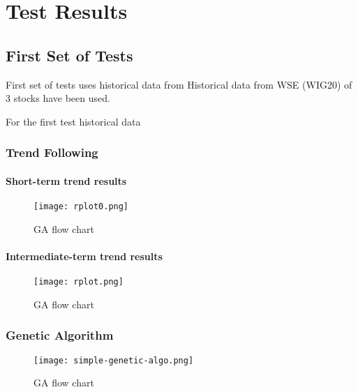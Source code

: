 \chapter{Test Results}
\label{cha:pierwszyDokument}

\section{First Set of Tests}

First set of tests uses historical data from 
Historical data from WSE (WIG20) of 3 stocks have been used.


For the first test historical data

\subsection{Trend Following}

\subsubsection{Short-term trend results}

\begin{figure}[H]
  \begin{center}
    \texttt{[image: rplot0.png]}
  \end{center}
  \caption{GA flow chart \cite{Haupt:2004:PGA:1007746}}
\end{figure}


\subsubsection{Intermediate-term trend results}

\begin{figure}[H]
  \begin{center}
    \texttt{[image: rplot.png]}
  \end{center}
  \caption{GA flow chart \cite{Haupt:2004:PGA:1007746}}
\end{figure}



\subsection{Genetic Algorithm}

\begin{figure}[H]
  \begin{center}
    \texttt{[image: simple-genetic-algo.png]}
  \end{center}
  \caption{GA flow chart \cite{Haupt:2004:PGA:1007746}}
\end{figure}


